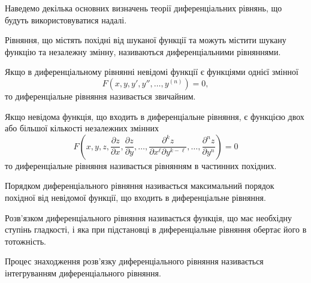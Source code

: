 Наведемо декілька основних визначень теорії диференціальних рівнянь, що будуть використовуватися надалі.

\begin{definition}
	Рівняння, що містять похідні від шуканої функції та можуть містити шукану функцію та незалежну змінну, називаються диференціальними рівняннями.
\end{definition}

\begin{definition}
	Якщо в диференціальному рівнянні невідомі функції є функціями однієї змінної
	\begin{equation}
		\label{eq:0.1}
		F \left( x, y, y', y'', \ldots, y^{(n)} \right) = 0,
	\end{equation}
	то диференціальне рівняння називається звичайним.
\end{definition}

\begin{definition}
	Якщо невідома функція, що входить в диференціальне рівняння, є функцією двох або більшої кількості незалежних змінних
	\begin{equation}
		\label{eq:0.2}
		F \left( x, y, z, \frac{\partial z}{\partial x}, \frac{\partial z}{\partial y}, \ldots, \frac{\partial^k z}{\partial x^\ell \partial y^{k - \ell}}, \ldots, \frac{\partial^n z}{\partial y^n} \right) = 0
	\end{equation}
	то диференціальне рівняння називається рівнянням в частинних похідних.
\end{definition}

\begin{definition}
	Порядком диференціального рівняння називається максимальний порядок похідної від невідомої функції, що входить в диференціальне рівняння.
\end{definition}

\begin{definition}
	Розв’язком диференціального рівняння називається функція, що має необхідну ступінь гладкості, і яка при підстановці в диференціальне рівняння обертає його в тотожність. 
\end{definition}

\begin{definition}
	Процес знаходження розв’язку диференціального рівняння називається інтегруванням диференціального рівняння.
\end{definition}
